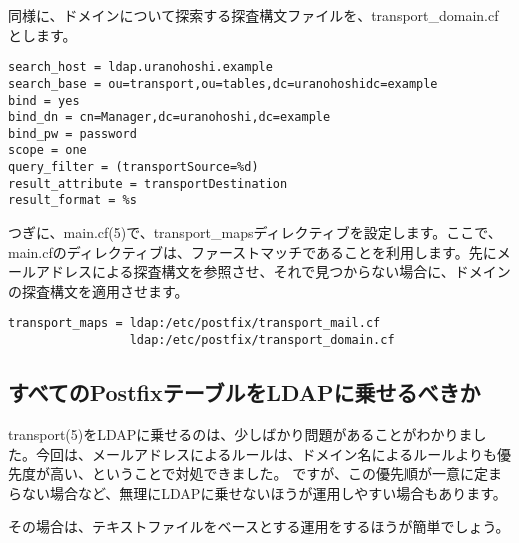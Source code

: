 同様に、ドメインについて探索する探査構文ファイルを、transport\_domain.cfとします。

\begin{verbatim}
search_host = ldap.uranohoshi.example
search_base = ou=transport,ou=tables,dc=uranohoshidc=example
bind = yes
bind_dn = cn=Manager,dc=uranohoshi,dc=example
bind_pw = password
scope = one
query_filter = (transportSource=%d)
result_attribute = transportDestination
result_format = %s
\end{verbatim}

つぎに、main.cf(5)で、transport\_mapsディレクティブを設定します。ここで、main.cfのディレクティブは、ファーストマッチであることを利用します。先にメールアドレスによる探査構文を参照させ、それで見つからない場合に、ドメインの探査構文を適用させます。

\begin{verbatim}
transport_maps = ldap:/etc/postfix/transport_mail.cf
                 ldap:/etc/postfix/transport_domain.cf
\end{verbatim}

\subsection{すべてのPostfixテーブルをLDAPに乗せるべきか}

transport(5)をLDAPに乗せるのは、少しばかり問題があることがわかりました。今回は、メールアドレスによるルールは、ドメイン名によるルールよりも優先度が高い、ということで対処できました。
ですが、この優先順が一意に定まらない場合など、無理にLDAPに乗せないほうが運用しやすい場合もあります。

その場合は、テキストファイルをベースとする運用をするほうが簡単でしょう。